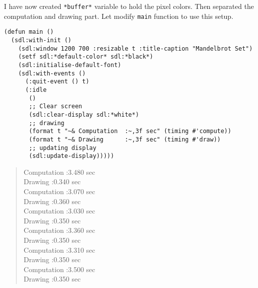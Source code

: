 \documentclass[11pt,a4paper]{article}
\begin{document}
I have now created \texttt{*buffer*} variable to hold the pixel colors. Then separated the computation and drawing part. 
Let modify \texttt{main} function to use this setup. 
\begin{lstlisting}
(defun main ()
  (sdl:with-init ()
    (sdl:window 1200 700 :resizable t :title-caption "Mandelbrot Set")
    (setf sdl:*default-color* sdl:*black*)
    (sdl:initialise-default-font)
    (sdl:with-events ()
      (:quit-event () t)
      (:idle
       ()
       ;; Clear screen
       (sdl:clear-display sdl:*white*)
       ;; drawing
       (format t "~& Computation  :~,3f sec" (timing #'compute))
       (format t "~& Drawing      :~,3f sec" (timing #'draw))
       ;; updating display
       (sdl:update-display)))))
\end{lstlisting}
\begin{verse}
Computation  :3.480 sec\\
\hspace*{1em}Drawing      :0.340 sec\\
\hspace*{1em}Computation  :3.070 sec\\
\hspace*{1em}Drawing      :0.360 sec\\
\hspace*{1em}Computation  :3.030 sec\\
\hspace*{1em}Drawing      :0.350 sec\\
\hspace*{1em}Computation  :3.360 sec\\
\hspace*{1em}Drawing      :0.350 sec\\
\hspace*{1em}Computation  :3.310 sec\\
\hspace*{1em}Drawing      :0.350 sec\\
\hspace*{1em}Computation  :3.500 sec\\
\hspace*{1em}Drawing      :0.350 sec\\
\end{verse}
\end{document}
